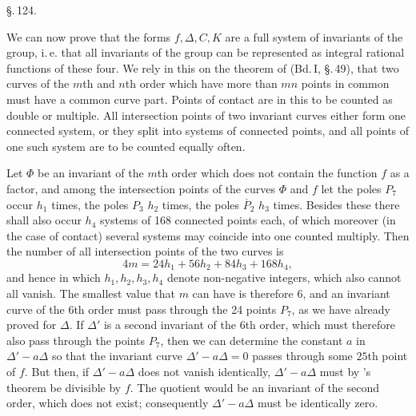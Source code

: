 \begin{center}
§.\,124.

\end{center}

We can now prove that the forms $f, \Delta, C, K$ are a
full system of invariants of the group, i.\,e. that all invariants
of the group can be represented as integral rational functions of these
four. We rely in this on the theorem of
 (Bd.\,I, §.\,49), that two curves of the $m$th
and $n$th order which have more than $mn$ points in common
must have a common curve part. Points of contact are
in this to be counted as double or multiple. All intersection points of two
invariant curves either form one connected system, or they
split into systems of connected points, and all points of one
such system are to be counted equally often.

Let $\Phi$ be an invariant of the $m$th order which does not contain the function
$f$ as a factor, and among the intersection points of the curves
$\Phi$ and $f$ let the poles $P_7$ occur $h_1$ times, the poles $P_3$ $h_2$ times,
the poles $\overline{P}_2$ $h_3$ times. Besides these there shall also occur $h_4$
systems of 168 connected points each, of which moreover
(in the case of contact) several systems may coincide into one counted multiply.
Then the number of all intersection points of the two curves is
\[
4m = 24h_1 + 56h_2 + 84h_3 + 168h_4,
\]
and hence
in which $h_1, h_2, h_3, h_4$ denote non-negative integers, which
also cannot all vanish. The smallest value that $m$
can have is therefore 6, and an invariant curve of the $6$th
order must pass through the 24 points $P_7$, as we have
already proved for $\Delta$. If $\Delta'$ is a second invariant
of the $6$th order, which must therefore also pass through the points $P_7$,
then we can determine the constant $a$ in $\Delta' - a\Delta$ so
that the invariant curve $\Delta' - a\Delta = 0$ passes through
some $25$th point of $f$. But then, if
$\Delta' - a\Delta$ does not vanish identically,
$\Delta' - a\Delta$ must by 's theorem be divisible
by $f$. The quotient would be an invariant of the second order, which does not
exist; consequently $\Delta' - a\Delta$ must be identically zero.
